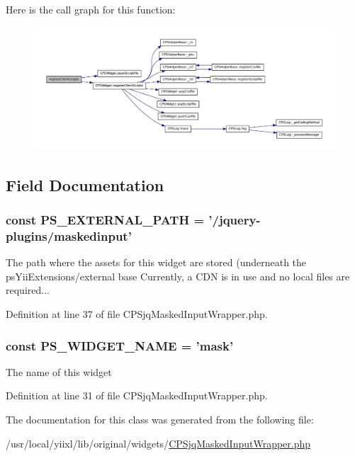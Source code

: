Here is the call graph for this function:\nopagebreak
\begin{figure}[H]
\begin{center}
\leavevmode
\includegraphics[width=400pt]{classCPSjqMaskedInputWrapper_ac02a66bde8e72e4909137bf748edf665_cgraph}
\end{center}
\end{figure}




\subsection{Field Documentation}
\hypertarget{classCPSjqMaskedInputWrapper_a8ccb5e1d65c091f944a6aa8c5be834ca}{
\subsubsection[{PS\_\-EXTERNAL\_\-PATH}]{\setlength{\rightskip}{0pt plus 5cm}const {\bf PS\_\-EXTERNAL\_\-PATH} = '/jquery-\/plugins/maskedinput'}}
\label{classCPSjqMaskedInputWrapper_a8ccb5e1d65c091f944a6aa8c5be834ca}
The path where the assets for this widget are stored (underneath the psYiiExtensions/external base Currently, a CDN is in use and no local files are required... 

Definition at line 37 of file CPSjqMaskedInputWrapper.php.

\hypertarget{classCPSjqMaskedInputWrapper_ae357f9dc377f7de0d12010b2ced28cbc}{
\subsubsection[{PS\_\-WIDGET\_\-NAME}]{\setlength{\rightskip}{0pt plus 5cm}const {\bf PS\_\-WIDGET\_\-NAME} = 'mask'}}
\label{classCPSjqMaskedInputWrapper_ae357f9dc377f7de0d12010b2ced28cbc}
The name of this widget 

Definition at line 31 of file CPSjqMaskedInputWrapper.php.



The documentation for this class was generated from the following file:\begin{DoxyCompactItemize}
\item 
/usr/local/yiixl/lib/original/widgets/\hyperlink{CPSjqMaskedInputWrapper_8php}{CPSjqMaskedInputWrapper.php}\end{DoxyCompactItemize}
